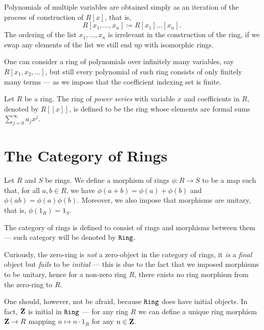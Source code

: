 Polynomials of multiple variables are obtained simply as an iteration of the
process of construction of \(R[x]\), that is,
\[
    R[x_1, \dots, x_n] \coloneq R[x_1] \dots [x_n].
\]
The ordering of the list \(x_1, \dots, x_n\) is irrelevant in the construction
of the ring, if we swap any elements of the list we still end up with isomorphic
rings.

One can consider a ring of polynomials over infinitely many variables, say
\(R[x_1, x_2, \dots]\), but still every polynomial of such ring consists of only
finitely many terms --- as we impose that the coefficient indexing set is
finite.

%
\begin{definition}
    \label{def:power-series-ring}
    Let \(R\) be a ring. The ring of \emph{power series} with variable \(x\) and
    coefficients in \(R\), denoted by \(R[\![x]\!]\), is defined to be the ring
    whose elements are formal sums \(\sum_{j=0}^{\infty} a_j x^j\).
\end{definition}
%

\section{The Category of Rings}

%
\begin{definition}
    \label{def:ring-morphism}
    Let \(R\) and \(S\) be rings. We define a morphism of rings \(\phi: R \to S\) to
    be a map such that, for all \(a, b \in R\), we have \(\phi(a + b) = \phi(a) +
    \phi(b)\) and \(\phi(a b) = \phi(a) \phi(b)\). Moreover, we also impose that
    morphisms are unitary, that is, \(\phi(1_R) = 1_S\).
\end{definition}
%

%
\begin{definition}
    \label{def:ring-category}
    The category of rings is defined to consist of rings and morphisms between them
    --- such category will be denoted by \({\texttt{Ring}}\).
\end{definition}
%

%
\begin{remark}
    \label{rem:zero-ring-not-zero-object-in-Ring}
    Curiously, the zero-ring is \emph{not} a zero-object in the category of rings,
    it \emph{is} a \emph{final} object but \emph{fails} to be \emph{initial} ---
    this is due to the fact that we imposed morphisms to be unitary, hence for a
    non-zero ring \(R\), there exists no ring morphism from the zero-ring to \(R\).

    One should, however, not be afraid, because \({\texttt{Ring}}\) does have initial objects.
    In fact, \(\mathbf{Z}\) is initial in \({\texttt{Ring}}\) --- for any ring \(R\) we can
    define a unique ring morphism \(\mathbf{Z} \to R\) mapping \(n \mapsto n \cdot 1_R\)
    for any \(n \in \mathbf{Z}\).
\end{remark}
%

